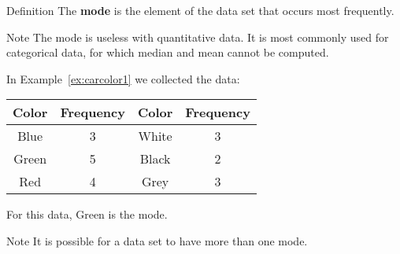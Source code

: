 \documentclass{beamer}
\begin{document}
\begin{frame}
\begin{block}{Definition}
The \textbf{mode} is the element of the data set that occurs most frequently.
\end{block}\pause

\begin{block}{Note}
The mode is useless with quantitative data. It is most commonly used for categorical data, for which median and mean cannot be computed. 
\end{block}\pause

\begin{example}
In Example~\ref{ex:carcolor1} we collected the data:

\vspace{-2mm}
\begin{center}
\begin{tabular}{|c|c||c|c|}
\hline
Color & Frequency & Color & Frequency \\\hline
Blue & 3 & White & 3\\\hline
Green & 5 & Black & 2\\\hline
Red & 4 & Grey & 3\\\hline
\end{tabular}
\end{center}

\vspace{-2mm}
For this data, Green is the mode.
\end{example}\pause

\begin{block}{Note}
It is possible for a data set to have more than one mode.
\end{block}
\end{frame}
\end{document}
